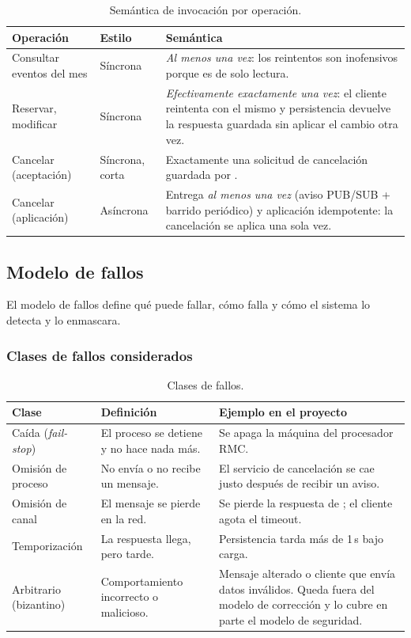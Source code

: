 \begin{table}[H]
\centering
\caption{Semántica de invocación por operación.}
\begin{tabularx}{\textwidth}{p{4.2cm}p{2.6cm}Y}
\toprule
Operación & Estilo & Semántica \\
\midrule
Consultar eventos del mes & Síncrona & \emph{Al menos una vez}: los reintentos son
inofensivos porque es de solo lectura. \\
Reservar, modificar & Síncrona & \emph{Efectivamente exactamente una vez}: el
cliente reintenta con el mismo  y persistencia devuelve la
respuesta guardada sin aplicar el cambio otra vez. \\
Cancelar (aceptación) & Síncrona, corta & Exactamente una solicitud de cancelación
guardada por . \\
Cancelar (aplicación) & Asíncrona & Entrega \emph{al menos una vez} (aviso
PUB/SUB + barrido periódico) y aplicación idempotente: la cancelación se aplica una
sola vez. \\
\bottomrule
\end{tabularx}
\end{table}

\subsection{Modelo de fallos}

El modelo de fallos define qué puede fallar, cómo falla y cómo el sistema lo detecta
y lo enmascara.

\subsubsection{Clases de fallos considerados}

\begin{table}[H]
\centering
\caption{Clases de fallos.}
\begin{tabularx}{\textwidth}{p{3.3cm}Y Y}
\toprule
Clase & Definición & Ejemplo en el proyecto \\
\midrule
Caída (\emph{fail-stop}) & El proceso se detiene y no hace nada más. &
Se apaga la máquina del procesador RMC. \\
Omisión de proceso & No envía o no recibe un mensaje. & El servicio de cancelación
se cae justo después de recibir un aviso. \\
Omisión de canal & El mensaje se pierde en la red. & Se pierde la respuesta de
; el cliente agota el timeout. \\
Temporización & La respuesta llega, pero tarde. & Persistencia tarda más de 1\,s
bajo carga. \\
Arbitrario (bizantino) & Comportamiento incorrecto o malicioso. & Mensaje alterado
o cliente que envía datos inválidos. Queda fuera del modelo de corrección y lo
cubre en parte el modelo de seguridad. \\
\bottomrule
\end{tabularx}
\end{table}

